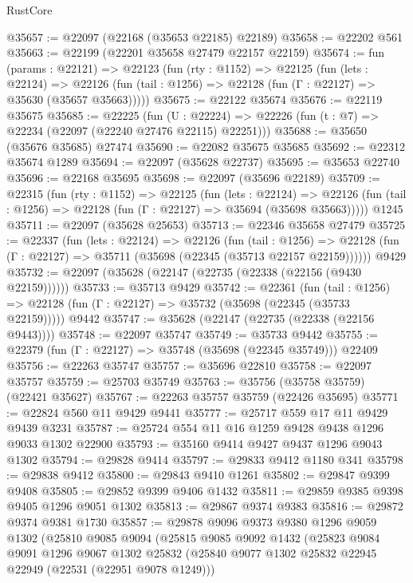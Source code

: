 \begin{lexlean}{RustCore}
\begin{coremodule}
@35657 := @22097 (@22168 (@35653 @22185) @22189)
@35658 := @22202 @561
@35663 := @22199 (@22201 @35658 @27479 @22157 @22159)
@35674 := fun (params : @22121) =>
  @22123
    (fun (rty : @1152) =>
    @22125
      (fun (lets : @22124) =>
      @22126 (fun (tail : @1256) => @22128 (fun (Γ : @22127) => @35630 (@35657 @35663)))))
@35675 := @22122 @35674
@35676 := @22119 @35675
@35685 := @22225
    (fun (U : @22224) => @22226 (fun (t : @7) => @22234 (@22097 (@22240 @27476 @22115) @22251)))
@35688 := @35650 (@35676 @35685) @27474
@35690 := @22082 @35675 @35685
@35692 := @22312 @35674 @1289
@35694 := @22097 (@35628 @22737)
@35695 := @35653 @22740
@35696 := @22168 @35695
@35698 := @22097 (@35696 @22189)
@35709 := @22315
    (fun (rty : @1152) =>
    @22125
      (fun (lets : @22124) =>
      @22126 (fun (tail : @1256) => @22128 (fun (Γ : @22127) => @35694 (@35698 @35663)))))
    @1245
@35711 := @22097 (@35628 @25653)
@35713 := @22346 @35658 @27479
@35725 := @22337
    (fun (lets : @22124) =>
    @22126
      (fun (tail : @1256) =>
      @22128 (fun (Γ : @22127) => @35711 (@35698 (@22345 (@35713 @22157 @22159))))))
    @9429
@35732 := @22097 (@35628 (@22147 (@22735 (@22338 (@22156 (@9430 @22159))))))
@35733 := @35713 @9429
@35742 := @22361
    (fun (tail : @1256) => @22128 (fun (Γ : @22127) => @35732 (@35698 (@22345 (@35733 @22159)))))
    @9442
@35747 := @35628 (@22147 (@22735 (@22338 (@22156 @9443))))
@35748 := @22097 @35747
@35749 := @35733 @9442
@35755 := @22379 (fun (Γ : @22127) => @35748 (@35698 (@22345 @35749))) @22409
@35756 := @22263 @35747
@35757 := @35696 @22810
@35758 := @22097 @35757
@35759 := @25703 @35749
@35763 := @35756 (@35758 @35759) (@22421 @35627)
@35767 := @22263 @35757 @35759 (@22426 @35695)
@35771 := @22824 @560 @11 @9429 @9441
@35777 := @25717 @559 @17 @11 @9429 @9439 @3231
@35787 := @25724 @554 @11 @16 @1259 @9428 @9438 @1296 @9033 @1302 @22900
@35793 := @35160 @9414 @9427 @9437 @1296 @9043 @1302
@35794 := @29828 @9414
@35797 := @29833 @9412 @1180 @341
@35798 := @29838 @9412
@35800 := @29843 @9410 @1261
@35802 := @29847 @9399 @9408
@35805 := @29852 @9399 @9406 @1432
@35811 := @29859 @9385 @9398 @9405 @1296 @9051 @1302
@35813 := @29867 @9374 @9383
@35816 := @29872 @9374 @9381 @1730
@35857 := @29878
    @9096
    @9373
    @9380
    @1296
    @9059
    @1302
    (@25810
      @9085
      @9094
      (@25815
        @9085
        @9092
        @1432
        (@25823
          @9084
          @9091
          @1296
          @9067
          @1302
          @25832
          (@25840 @9077 @1302 @25832 @22945 @22949 (@22531 (@22951 @9078 @1249)))

\end{coremodule}
\end{lexlean}
